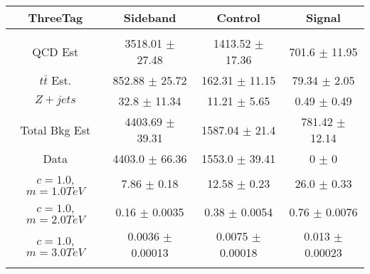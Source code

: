 \begin{footnotesize} 
\begin{tabular}{c|c|c|c} 
ThreeTag & Sideband & Control & Signal \\ 
\hline\hline 
& & & \\ 
QCD Est & 3518.01 $\pm$ 27.48 & 1413.52 $\pm$ 17.36 & 701.6 $\pm$ 11.95\\ 
$t\bar{t}$ Est.  & 852.88 $\pm$ 25.72 & 162.31 $\pm$ 11.15 & 79.34 $\pm$ 2.05\\ 
$Z+jets$ & 32.8 $\pm$ 11.34 & 11.21 $\pm$ 5.65 & 0.49 $\pm$ 0.49\\ 
Total Bkg Est & 4403.69 $\pm$ 39.31 & 1587.04 $\pm$ 21.4 & 781.42 $\pm$ 12.14\\ 
Data & 4403.0 $\pm$ 66.36 & 1553.0 $\pm$ 39.41 & 0 $\pm$ 0\\ 
$c=1.0$,$m=1.0TeV$ & 7.86 $\pm$ 0.18 & 12.58 $\pm$ 0.23 & 26.0 $\pm$ 0.33\\ 
$c=1.0$,$m=2.0TeV$ & 0.16 $\pm$ 0.0035 & 0.38 $\pm$ 0.0054 & 0.76 $\pm$ 0.0076\\ 
$c=1.0$,$m=3.0TeV$ & 0.0036 $\pm$ 0.00013 & 0.0075 $\pm$ 0.00018 & 0.013 $\pm$ 0.00023\\ 
& & & \\ 
\hline\hline 
\end{tabular} 
\end{footnotesize} 
\newline 
